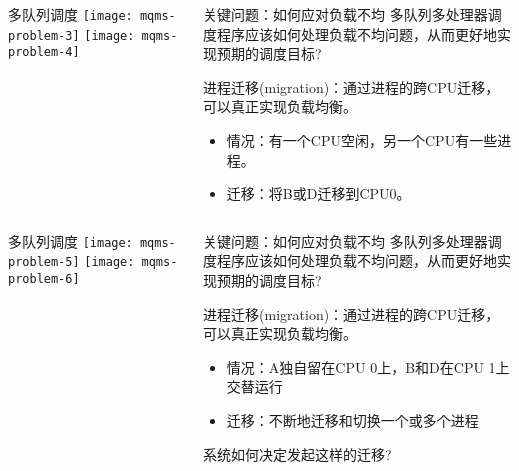 \begin{frame}
	\begin{columns}
		\begin{column}{.5\textwidth}
			\Large \centering
			多队列调度
			\texttt{[image: mqms-problem-3]}
			\texttt{[image: mqms-problem-4]}	
		\end{column}
		
		\begin{column}{.5\textwidth}
			\begin{block}{关键问题：如何应对负载不均}
			多队列多处理器调度程序应该如何处理负载不均问题，从而更好地实现预期的调度目标?
			\end{block} 
			\normalsize
			进程迁移(migration)：通过进程的跨CPU迁移，可以真正实现负载均衡。 \pause
			
			\begin{itemize}
				\item 情况：有一个CPU空闲，另一个CPU有一些进程。
				\item 迁移：将B或D迁移到CPU0。
		
			\end{itemize}
			\Large

		\end{column}
	\end{columns}
\end{frame}



\begin{frame}
	\begin{columns}
		\begin{column}{.5\textwidth}
			\Large \centering
			多队列调度
			\texttt{[image: mqms-problem-5]}
			\texttt{[image: mqms-problem-6]}	
		\end{column}
		
		\begin{column}{.5\textwidth}
			\begin{block}{关键问题：如何应对负载不均}
			多队列多处理器调度程序应该如何处理负载不均问题，从而更好地实现预期的调度目标?
			\end{block} 
			\normalsize
			进程迁移(migration)：通过进程的跨CPU迁移，可以真正实现负载均衡。 
			
			\begin{itemize}
				\item 情况：A独自留在CPU 0上，B和D在CPU 1上交替运行
				\item 迁移：不断地迁移和切换一个或多个进程

			\end{itemize} \pause
		\large
		系统如何决定发起这样的迁移?
			\Large
			
		\end{column}
	\end{columns}
\end{frame}



